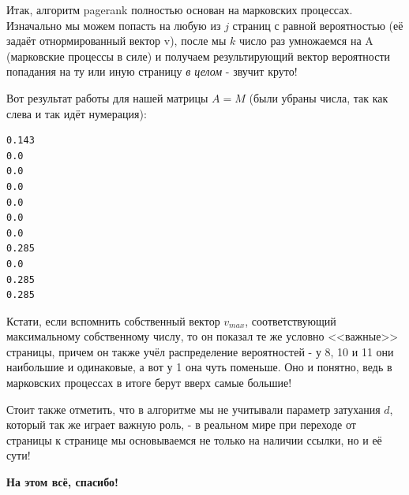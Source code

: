 \documentclass[a4paper,hidelinks,14pt]{extarticle}
\begin{document}
	Итак, алгоритм pagerank полностью основан на марковских процессах. Изначально мы можем попасть на любую из $j$ страниц с равной вероятностью (её задаёт отнормированный вектор v), после мы $k$ число раз умножаемся на A (марковские процессы в силе) и получаем результирующий вектор вероятности попадания на ту или иную страницу \textit{в целом} - звучит круто!
	
	Вот результат работы для нашей матрицы $A=M$ (были убраны числа, так как слева и так идёт нумерация):
	\begin{lstlisting}
0.143
0.0
0.0
0.0
0.0
0.0
0.0
0.285
0.0
0.285
0.285		
	\end{lstlisting}
	
	Кстати, если вспомнить собственный вектор $v_{max}$, соответствующий максимальному собственному числу, то он показал те же условно <<важные>> страницы, причем он также учёл распределение вероятностей - у 8, 10 и 11 они наибольшие и одинаковые, а вот у 1 она чуть поменьше. Оно и понятно, ведь в марковских процессах в итоге берут вверх самые большие!
	
	Стоит также отметить, что в алгоритме мы не учитывали параметр затухания $d$, который так же играет важную роль, - в реальном мире при переходе от страницы к странице мы основываемся не только на наличии ссылки, но и её сути!
	
	\textbf{На этом всё, спасибо!}
	
\end{document}
